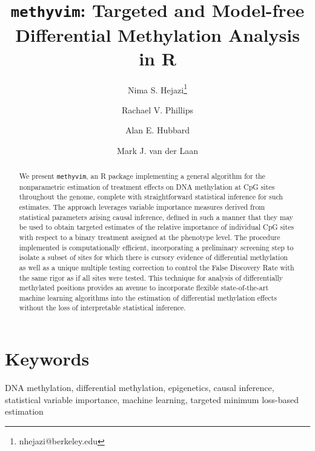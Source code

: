 \documentclass[9pt,a4paper,]{extarticle}
\theoremstyle{definition}
\theoremstyle{definition}
\theoremstyle{definition}
\theoremstyle{remark}
\begin{document}
\pagestyle{front}

\title{\texttt{methyvim}: Targeted and Model-free Differential Methylation Analysis in R}

\author[1,2]{Nima S. Hejazi\thanks{\ttfamily nhejazi@berkeley.edu}}
\author[1]{Rachael V. Phillips}
\author[1]{Alan E. Hubbard}
\author[1,3]{Mark J. van der Laan}

\maketitle
\thispagestyle{front}

\begin{abstract}
We present \texttt{methyvim}, an R package implementing a general algorithm for the
nonparametric estimation of treatment effects on DNA methylation at CpG sites
throughout the genome, complete with straightforward statistical inference for
such estimates. The approach leverages variable importance measures derived
from statistical parameters arising causal inference, defined in such a manner
that they may be used to obtain targeted estimates of the relative importance
of individual CpG sites with respect to a binary treatment assigned at the
phenotype level. The procedure implemented is computationally efficient,
incorporating a preliminary screening step to isolate a subset of sites for
which there is cursory evidence of differential methylation as well as a
unique multiple testing correction to control the False Discovery Rate with
the same rigor as if all sites were tested. This technique for analysis of
differentially methylated positions provides an avenue to incorporate flexible
state-of-the-art machine learning algorithms into the estimation of
differential methylation effects without the loss of interpretable statistical
inference.
\end{abstract}

\section*{Keywords}
DNA methylation, differential methylation, epigenetics, causal inference, statistical variable importance, machine learning, targeted minimum loss-based estimation


\clearpage
\pagestyle{main}
\end{document}
